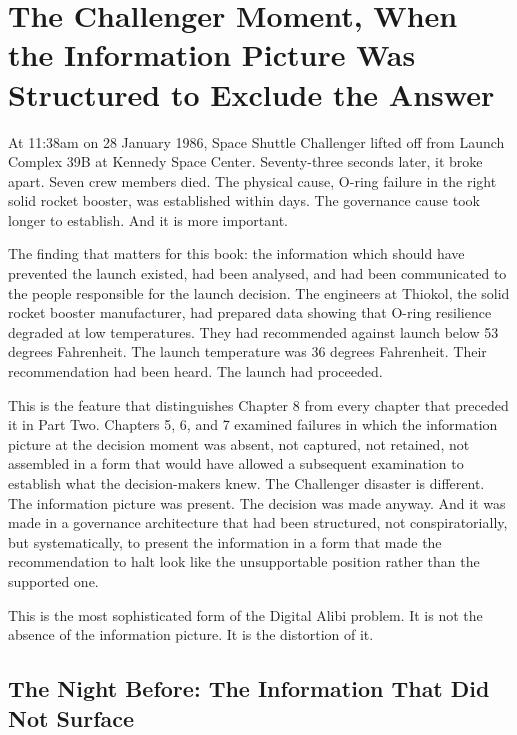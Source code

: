 
\chapter{The Challenger Moment, When the Information Picture Was Structured to Exclude the Answer}

At 11:38am on 28 January 1986, Space Shuttle Challenger lifted off from Launch Complex 39B at Kennedy Space Center. Seventy-three seconds later, it broke apart. Seven crew members died. The physical cause, O-ring failure in the right solid rocket booster, was established within days. The governance cause took longer to establish. And it is more important.

The finding that matters for this book: the information which should have prevented the launch existed, had been analysed, and had been communicated to the people responsible for the launch decision. The engineers at Thiokol, the solid rocket booster manufacturer, had prepared data showing that O-ring resilience degraded at low temperatures. They had recommended against launch below 53 degrees Fahrenheit. The launch temperature was 36 degrees Fahrenheit. Their recommendation had been heard. The launch had proceeded.

This is the feature that distinguishes Chapter 8 from every chapter that preceded it in Part Two. Chapters 5, 6, and 7 examined failures in which the information picture at the decision moment was absent, not captured, not retained, not assembled in a form that would have allowed a subsequent examination to establish what the decision-makers knew. The Challenger disaster is different. The information picture was present. The decision was made anyway. And it was made in a governance architecture that had been structured, not conspiratorially, but systematically, to present the information in a form that made the recommendation to halt look like the unsupportable position rather than the supported one.

This is the most sophisticated form of the Digital Alibi problem. It is not the absence of the information picture. It is the distortion of it.

\scenebreak

\section{The Night Before: The Information That Did Not Surface}

